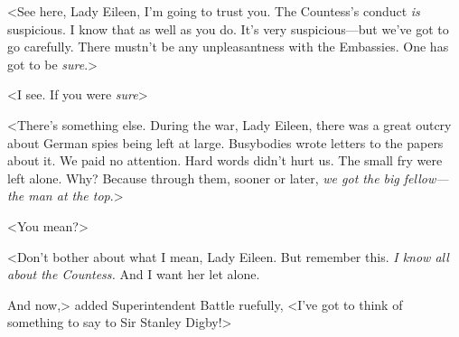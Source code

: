 <See here, Lady Eileen, I'm going to trust you. The Countess's conduct \emph{is} suspicious. I know that as well as you do. It's very suspicious—but we've got to go carefully. There mustn't be any unpleasantness with the Embassies. One has got to be \emph{sure}.>

<I see. If you were \emph{sure}\longdots>

<There's something else. During the war, Lady Eileen, there was a great outcry about German spies being left at large. Busybodies wrote letters to the papers about it. We paid no attention. Hard words didn't hurt us. The small fry were left alone. Why? Because through them, sooner or later, \emph{we got the big fellow—the man at the top}.>

<You mean?>

<Don't bother about what I mean, Lady Eileen. But remember this. \emph{I know all about the Countess.} And I want her let alone.

And now,> added Superintendent Battle ruefully, <I've got to think of something to say to Sir Stanley Digby!>